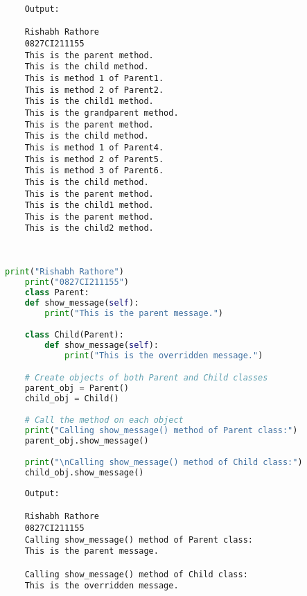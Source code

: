 \documentclass{report}
\begin{document}
\begin{verbatim}
	Output:

	Rishabh Rathore
	0827CI211155
	This is the parent method.
	This is the child method.
	This is method 1 of Parent1.
	This is method 2 of Parent2.
	This is the child1 method.
	This is the grandparent method.
	This is the parent method.
	This is the child method.
	This is method 1 of Parent4.
	This is method 2 of Parent5.
	This is method 3 of Parent6.
	This is the child method.
	This is the parent method.
	This is the child1 method.
	This is the parent method.
	This is the child2 method.

	

\end{verbatim}


\bigskip



\sol 
\begin{lstlisting}[language=Python]
	print("Rishabh Rathore")
	print("0827CI211155")
	class Parent:
    def show_message(self):
        print("This is the parent message.")

	class Child(Parent):
		def show_message(self):
			print("This is the overridden message.")

	# Create objects of both Parent and Child classes
	parent_obj = Parent()
	child_obj = Child()

	# Call the method on each object
	print("Calling show_message() method of Parent class:")
	parent_obj.show_message()

	print("\nCalling show_message() method of Child class:")
	child_obj.show_message()

\end{lstlisting}

\begin{verbatim}
	Output:

	Rishabh Rathore
	0827CI211155
	Calling show_message() method of Parent class:
	This is the parent message.
	
	Calling show_message() method of Child class:
	This is the overridden message.

\end{verbatim}


\bigskip
\end{document}
